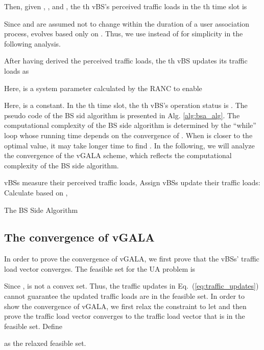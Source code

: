 \documentclass[journal]{IEEEtran}
\theoremstyle{definition}
\begin{document}
Then, given , , and , the th vBS's perceived traffic loads in the th time slot is

Since  and  are assumed not to change within the duration of a user association process,  evolves based only on . Thus, we use  instead of  for simplicity in the following analysis.

After having derived the perceived traffic loads, the th vBS updates its traffic loads as

Here,  is a system parameter calculated by the RANC to enable

Here,  is a constant.
In the th time slot, the th vBS's operation status is . The pseudo code of the BS sid algorithm is presented in Alg. \ref{alg:bsa_alg}. The computational complexity of the BS side algorithm is determined by the ``while'' loop whose running time depends on the convergence of . When  is closer to the optimal value, it may take longer time to find . In the following, we will analyze the convergence of the vGALA scheme, which reflects the computational complexity of the BS side algorithm.
\begin{algorithm}
\nl vBSs measure their perceived traffic loads, \;
\nl Assign \;
\nl {}
\nl vBSs update their traffic loads: \;
\nl Calculate  based on , \;
\caption{The BS Side Algorithm\label{alg:bsa_alg}}
\end{algorithm}

\subsection{The convergence of vGALA}
\label{subsec:convergence}
In order to prove the convergence of vGALA, we first prove that the vBSs' traffic load vector converges. The feasible set for the UA problem is

Since ,  is not a convex set. Thus, the traffic updates in Eq.~(\ref{eq:traffic_updates}) cannot guarantee the updated traffic loads are in the feasible set. In order to show the convergence of vGALA, we first relax the constraint to let  and then prove the traffic load vector converges to the traffic load vector that is in the feasible set. Define

as the relaxed feasible set.
\end{document}
